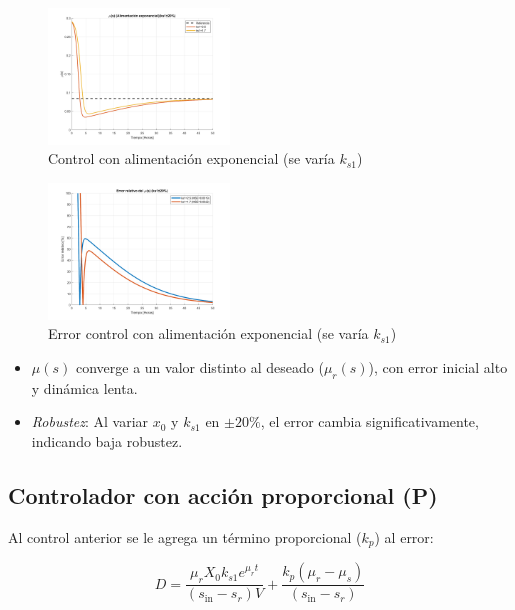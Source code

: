 \documentclass[letterpaper, 10 pt, conference]{ieeeconf}  %
\begin{document}
\begin{figure}[H]
  \centering
  \includegraphics[width=0.43\textwidth]{./Images_tp3/exp_ks1.png}
  \caption{Control con alimentación exponencial (se varía $k_{s1}$)}
\end{figure}
\begin{figure}[H]
  \centering
  \includegraphics[width=0.43\textwidth]{./Images_tp3/exp_err_ks1.png}
  \caption{Error control con alimentación exponencial (se varía $k_{s1}$)}
\end{figure}

\begin{itemize}  
    \item \(\mu(s)\) converge a un valor distinto al deseado (\(\mu_r(s)\)), con error inicial alto y dinámica lenta.  
    \item \textit{Robustez}: Al variar \(x_0\) y \(k_{s1}\) en \(\pm 20\%\), el error cambia significativamente, indicando baja robustez.  
\end{itemize}  

\subsection{Controlador con acción proporcional (P)}  
Al control anterior se le agrega un término proporcional (\(k_p\)) al error:

\begin{equation}
D = \frac{\mu_r X_0 k_{s1} e^{\mu_r t}}{(s_{\text{in}} - s_r) V} + \frac{k_p (\mu_r - \mu_s)}{(s_{\text{in}} - s_r)}
\end{equation}
\end{document}
